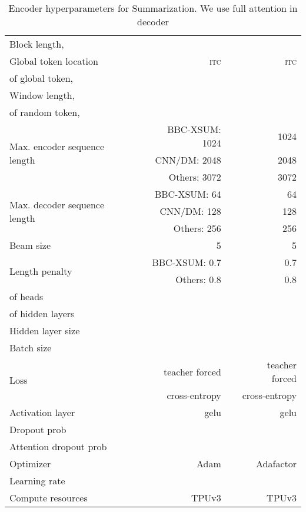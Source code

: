 \documentclass{article}
\begin{document}
\begin{table}[bht]
\begin{tabular}{@{}l r r c r @{}}
 Block length,  & &  & & \\
 Global token location & & \textsc{itc} & & \textsc{itc} \\
  of global token,  & &  & &  \\
 Window length,   & &  & &  \\
  of random token,  & &  & &  \\
 \multirow{3}{*}{Max. encoder sequence length} & & BBC-XSUM: \qquad \phantom{.}1024 & & 1024 \\
 & & CNN/DM: \qquad \phantom{.}2048  & & 2048 \\
 & & Others: \qquad \phantom{.}3072 & & 3072 \\
 \multirow{3}{*}{Max. decoder sequence length} & & BBC-XSUM: \qquad \phantom{10.}64 & & 64 \\
 & & CNN/DM: \qquad \phantom{1.}128  & & 128 \\
 & & Others: \qquad \phantom{1.}256  & & 256 \\
 Beam size & & 5 & & 5 \\
 \multirow{2}{*}{Length penalty} & & BBC-XSUM: \qquad \phantom{10}0.7 & & 0.7 \\
 & & Others: \qquad \phantom{10}0.8  & & 0.8 \\
  of heads & &  & & \\
  of hidden layers & &  & &  \\
 Hidden layer size & &  & &  \\
 Batch size & &  & &  \\
 \multirow{2}{*}{Loss} & & teacher forced & & teacher forced \\
 & & cross-entropy & & cross-entropy \\
 Activation layer & & gelu & & gelu \\ 
 Dropout prob & &  & &  \\
 Attention dropout prob & &  & &  \\
 Optimizer & & Adam & & Adafactor\\
 Learning rate & &   & & \\
  Compute resources & &  TPUv3 & &  TPUv3\\
\bottomrule
\end{tabular}
\vspace{2mm}
\caption{Encoder hyperparameters for Summarization. We use full attention in decoder}
\label{tab:app_sum}
\end{table}
\end{document}
